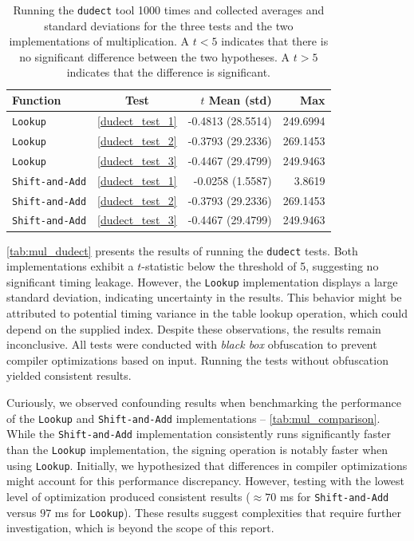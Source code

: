 \documentclass[11pt]{report}
\theoremstyle{definition}
\theoremstyle{plain}
\begin{document}
\begin{table}[H]
  \centering
  \begin{tabular}{|l|c|r|r|}
    \hline
    \textbf{Function}      & \textbf{Test}       & \textbf{$t$ Mean (std)} & \textbf{Max} \\ \hline
    \texttt{Lookup}        & \ref{dudect_test_1} & -0.4813 (28.5514)       & 249.6994     \\
    \texttt{Lookup}        & \ref{dudect_test_2} & -0.3793 (29.2336)       & 269.1453     \\
    \texttt{Lookup}        & \ref{dudect_test_3} & -0.4467 (29.4799)       & 249.9463     \\
    \texttt{Shift-and-Add} & \ref{dudect_test_1} & -0.0258 (1.5587)        & 3.8619       \\
    \texttt{Shift-and-Add} & \ref{dudect_test_2} & -0.3793 (29.2336)       & 269.1453     \\
    \texttt{Shift-and-Add} & \ref{dudect_test_3} & -0.4467 (29.4799)       & 249.9463     \\\hline
  \end{tabular}
  \caption{Running the \texttt{dudect} tool 1000 times and collected averages and standard deviations for the three tests and the two implementations of multiplication. A $t < 5$ indicates that there is no significant difference between the two hypotheses. A $t > 5$ indicates that the difference is significant.}
  \label{tab:mul_dudect}
\end{table}

\autoref{tab:mul_dudect} presents the results of running the \texttt{dudect} tests. Both implementations exhibit a $t$-statistic below the threshold of 5, suggesting no significant timing leakage. However, the \texttt{Lookup} implementation displays a large standard deviation, indicating uncertainty in the results. This behavior might be attributed to potential timing variance in the table lookup operation, which could depend on the supplied index. Despite these observations, the results remain inconclusive. All tests were conducted with \textit{black box} obfuscation to prevent compiler optimizations based on input. Running the tests without obfuscation yielded consistent results.

Curiously, we observed confounding results when benchmarking the performance of the \texttt{Lookup} and \texttt{Shift-and-Add} implementations -- \autoref{tab:mul_comparison}. While the \texttt{Shift-and-Add} implementation consistently runs significantly faster than the \texttt{Lookup} implementation, the signing operation is notably faster when using \texttt{Lookup}. Initially, we hypothesized that differences in compiler optimizations might account for this performance discrepancy. However, testing with the lowest level of optimization produced consistent results ($\approx 70$ ms for \texttt{Shift-and-Add} versus $97$ ms for \texttt{Lookup}). These results suggest complexities that require further investigation, which is beyond the scope of this report.
\end{document}
